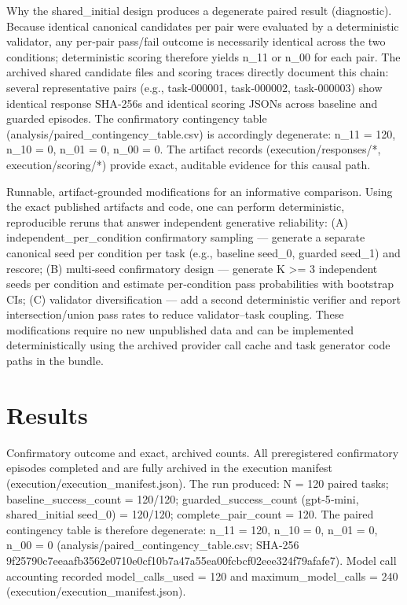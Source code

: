 \documentclass[conference]{IEEEtran}
\begin{document}
Why the shared\_initial design produces a degenerate paired result (diagnostic). Because identical canonical candidates per pair were evaluated by a deterministic validator, any per‑pair pass/fail outcome is necessarily identical across the two conditions; deterministic scoring therefore yields n\_11 or n\_00 for each pair. The archived shared candidate files and scoring traces directly document this chain: several representative pairs (e.g., task‑000001, task‑000002, task‑000003) show identical response SHA‑256s and identical scoring JSONs across baseline and guarded episodes. The confirmatory contingency table (analysis/paired\_contingency\_table.csv) is accordingly degenerate: n\_11 = 120, n\_10 = 0, n\_01 = 0, n\_00 = 0. The artifact records (execution/responses/*, execution/scoring/*) provide exact, auditable evidence for this causal path.

Runnable, artifact‑grounded modifications for an informative comparison. Using the exact published artifacts and code, one can perform deterministic, reproducible reruns that answer independent generative reliability: (A) independent\_per\_condition confirmatory sampling --- generate a separate canonical seed per condition per task (e.g., baseline seed\_0, guarded seed\_1) and rescore; (B) multi‑seed confirmatory design --- generate K >= 3 independent seeds per condition and estimate per‑condition pass probabilities with bootstrap CIs; (C) validator diversification --- add a second deterministic verifier and report intersection/union pass rates to reduce validator--task coupling. These modifications require no new unpublished data and can be implemented deterministically using the archived provider call cache and task generator code paths in the bundle.

\section{Results}
Confirmatory outcome and exact, archived counts. All preregistered confirmatory episodes completed and are fully archived in the execution manifest (execution/execution\_manifest.json). The run produced: N = 120 paired tasks; baseline\_success\_count = 120/120; guarded\_success\_count (gpt‑5‑mini, shared\_initial seed\_0) = 120/120; complete\_pair\_count = 120. The paired contingency table is therefore degenerate: n\_11 = 120, n\_10 = 0, n\_01 = 0, n\_00 = 0 (analysis/paired\_contingency\_table.csv; SHA‑256 9f25790c7eeaafb3562e0710e0cf10b7a47a55ea00fcbcf02eee324f79afafe7). Model call accounting recorded model\_calls\_used = 120 and maximum\_model\_calls = 240 (execution/execution\_manifest.json).
\end{document}

